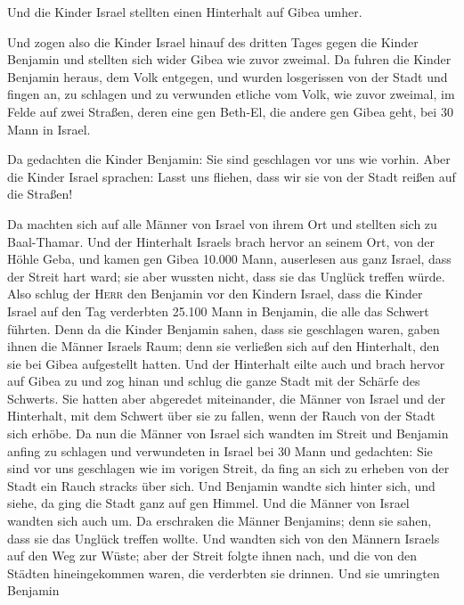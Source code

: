  Und die Kinder Israel stellten einen Hinterhalt auf
Gibea umher.

 Und zogen also die Kinder Israel hinauf des dritten
Tages gegen die Kinder Benjamin und stellten sich wider Gibea wie zuvor
zweimal.  Da fuhren die Kinder Benjamin heraus, dem Volk
entgegen, und wurden losgerissen von der Stadt und fingen an, zu
schlagen und zu verwunden etliche vom Volk, wie zuvor zweimal, im Felde
auf zwei Straßen, deren eine gen Beth-El, die andere gen Gibea geht, bei
30 Mann in Israel.

 Da gedachten die Kinder Benjamin: Sie sind geschlagen
vor uns wie vorhin. Aber die Kinder Israel sprachen: Lasst uns fliehen,
dass wir sie von der Stadt reißen auf die Straßen!

 Da machten sich auf alle Männer von Israel von ihrem Ort
und stellten sich zu Baal-Thamar. Und der Hinterhalt Israels brach
hervor an seinem Ort, von der Höhle Geba,  und kamen gen
Gibea 10.000 Mann, auserlesen aus ganz Israel, dass der Streit hart
ward; sie aber wussten nicht, dass sie das Unglück treffen würde.
 Also schlug der \textsc{Herr} den Benjamin vor den
Kindern Israel, dass die Kinder Israel auf den Tag verderbten 25.100
Mann in Benjamin, die alle das Schwert führten.  Denn da
die Kinder Benjamin sahen, dass sie geschlagen waren, gaben ihnen die
Männer Israels Raum; denn sie verließen sich auf den Hinterhalt, den sie
bei Gibea aufgestellt hatten.  Und der Hinterhalt eilte
auch und brach hervor auf Gibea zu und zog hinan und schlug die ganze
Stadt mit der Schärfe des Schwerts.  Sie hatten aber
abgeredet miteinander, die Männer von Israel und der Hinterhalt, mit dem
Schwert über sie zu fallen, wenn der Rauch von der Stadt sich erhöbe.
 Da nun die Männer von Israel sich wandten im Streit und
Benjamin anfing zu schlagen und verwundeten in Israel bei 30 Mann und
gedachten: Sie sind vor uns geschlagen wie im vorigen Streit,
 da fing an sich zu erheben von der Stadt ein Rauch
stracks über sich. Und Benjamin wandte sich hinter sich, und siehe, da
ging die Stadt ganz auf gen Himmel.  Und die Männer von
Israel wandten sich auch um. Da erschraken die Männer Benjamins; denn
sie sahen, dass sie das Unglück treffen wollte.  Und
wandten sich von den Männern Israels auf den Weg zur Wüste; aber der
Streit folgte ihnen nach, und die von den Städten hineingekommen waren,
die verderbten sie drinnen.  Und sie umringten Benjamin

